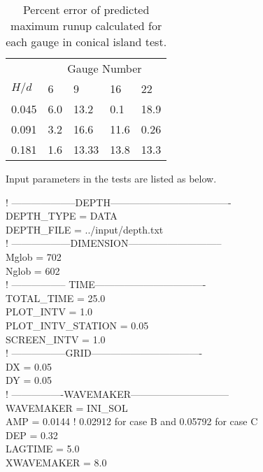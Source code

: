 \documentclass[11pt]{article}
\begin{document}
\begin{table}[t]
\centering
\begin{tabular}{l l l l l}
                &   \multicolumn{4}{c}{Gauge Number } \\ \cline{2-5}
      $H/d$ &   6  &  9  &  16  &  22  \\ \hline
      0.045 &  6.0  &  13.2  &  0.1  &  18.9  \\
      0.091 &  3.2  &  16.6  & 11.6  &  0.26  \\
      0.181 &  1.6  &  13.33  &  13.8  &  13.3 \\
\end{tabular}
\caption{Percent error of predicted maximum runup calculated for each gauge in conical island test.}
\label{table6}
\end{table}

Input parameters in the tests are listed as below.

\vspace*{0.5cm}

  ! --------------------DEPTH------------------------------------- \\
DEPTH\_TYPE = DATA\\
DEPTH\_FILE = ../input/depth.txt\\

  ! ------------------DIMENSION-----------------------------\\
Mglob = 702\\
Nglob = 602\\

  ! ----------------- TIME----------------------------------\\
TOTAL\_TIME = 25.0\\
PLOT\_INTV = 1.0\\
PLOT\_INTV\_STATION = 0.05\\
SCREEN\_INTV = 1.0\\

  ! -----------------GRID----------------------------------\\
DX = 0.05\\
DY = 0.05\\

  ! ----------------WAVEMAKER------------------------------\\
WAVEMAKER = INI\_SOL\\
AMP = 0.0144    !  0.02912 for case B and 0.05792 for case C\\
DEP = 0.32  \\
LAGTIME = 5.0\\
XWAVEMAKER = 8.0\\
\end{document}
